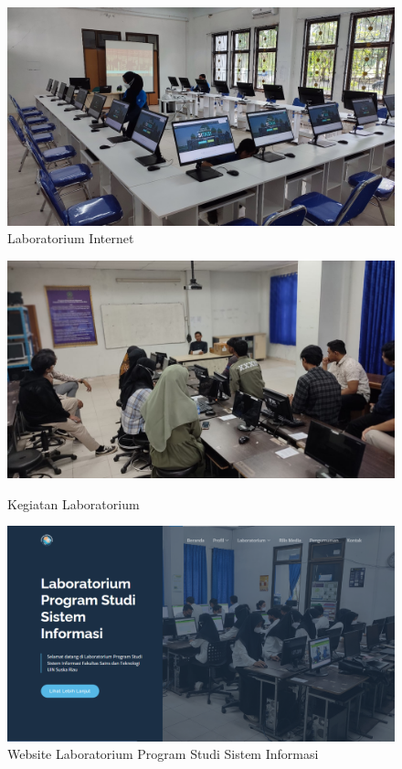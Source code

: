 \begin{figure}
	\centering
	\includegraphics[width=0.82\linewidth]{konten/gambar/lab-se.jpg}
	\caption{Laboratorium Internet \protect\cite{labsi2023}}
	\label{fig:lab-int}
\end{figure}

\begin{figure}
	\centering
	\includegraphics[width=0.82\linewidth]{konten/gambar/kegiatan.jpg}
	\caption{Kegiatan Laboratorium} \protect\cite{labsi2023}
	\label{fig:lab-se}
\end{figure}

\begin{figure}
	\centering
	\includegraphics[width=0.82\linewidth]{konten//gambar/labsi.png}
	\caption{Website Laboratorium Program Studi Sistem Informasi \protect\cite{web-prodi}}
	\label{fig:enter-label}
\end{figure}


